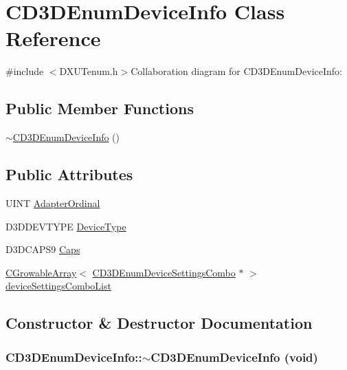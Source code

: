 \hypertarget{class_c_d3_d_enum_device_info}{
\section{CD3DEnumDeviceInfo Class Reference}
\label{class_c_d3_d_enum_device_info}
}


{\ttfamily \#include $<$DXUTenum.h$>$}Collaboration diagram for CD3DEnumDeviceInfo:\subsection*{Public Member Functions}
\begin{DoxyCompactItemize}
\item 
\hyperlink{class_c_d3_d_enum_device_info_ab95908e3f148358f694c34ee111947f6}{$\sim$CD3DEnumDeviceInfo} ()
\end{DoxyCompactItemize}
\subsection*{Public Attributes}
\begin{DoxyCompactItemize}
\item 
UINT \hyperlink{class_c_d3_d_enum_device_info_a19e791a4b3a5a97ca07ee9b99231aa0a}{AdapterOrdinal}
\item 
D3DDEVTYPE \hyperlink{class_c_d3_d_enum_device_info_a4c6d5932313ad036847ef4fdbf5fb927}{DeviceType}
\item 
D3DCAPS9 \hyperlink{class_c_d3_d_enum_device_info_a821cf46b5737e0070da582498fde308a}{Caps}
\item 
\hyperlink{class_c_growable_array}{CGrowableArray}$<$ \hyperlink{struct_c_d3_d_enum_device_settings_combo}{CD3DEnumDeviceSettingsCombo} $\ast$ $>$ \hyperlink{class_c_d3_d_enum_device_info_aa6f62fac8ff79d65e58fc40cff37789d}{deviceSettingsComboList}
\end{DoxyCompactItemize}


\subsection{Constructor \& Destructor Documentation}
\hypertarget{class_c_d3_d_enum_device_info_ab95908e3f148358f694c34ee111947f6}{
\subsubsection[{$\sim$CD3DEnumDeviceInfo}]{\setlength{\rightskip}{0pt plus 5cm}CD3DEnumDeviceInfo::$\sim$CD3DEnumDeviceInfo (void)}}
\label{class_c_d3_d_enum_device_info_ab95908e3f148358f694c34ee111947f6}


